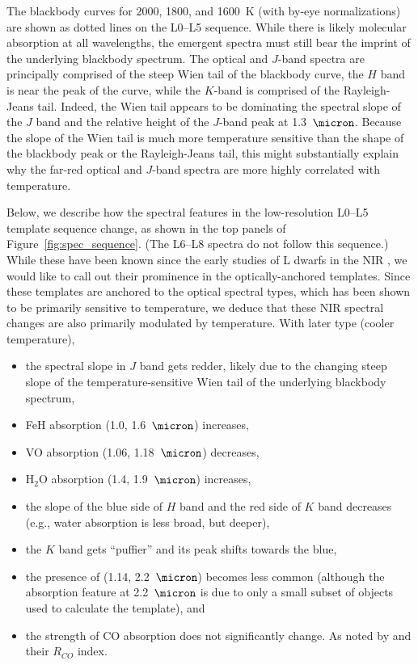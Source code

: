 \documentclass[12pt,preprint]{aastex}
\begin{document}
The blackbody curves for 2000, 1800, and 1600~K (with by-eye normalizations) are shown as dotted lines on the L0--L5 sequence. 
While there is likely molecular absorption at all wavelengths, the emergent spectra must still bear the imprint of the underlying blackbody spectrum.
The optical and $J$-band spectra are principally comprised of the steep Wien tail of the blackbody curve,
the $H$ band is near the peak of the curve, while the $K$-band is comprised of the Rayleigh-Jeans tail.
Indeed, the Wien tail appears to be dominating the spectral slope of the $J$ band and the relative height of the $J$-band peak at 1.3~$\micron$.
Because the slope of the Wien tail is much more temperature sensitive than the shape of the blackbody peak or the Rayleigh-Jeans tail, this might substantially explain why the far-red optical and $J$-band spectra are more highly correlated with temperature.

Below, we describe how the spectral features in the low-resolution L0--L5 template sequence change, as shown in the top panels of Figure~\ref{fig:spec_sequence}. (The L6--L8 spectra do not follow this sequence.)
While these have been known since the early studies of L dwarfs in the NIR \citep{Testi01,Geballe02}, we would like to call out their prominence in the optically-anchored templates.
Since these templates are anchored to the optical spectral types, which has been shown to be primarily sensitive to temperature, we deduce that these NIR spectral changes are also primarily modulated by temperature.
With later type (cooler temperature), 
\begin{itemize}
\item the spectral slope in $J$ band gets redder, likely due to the changing steep slope of the temperature-sensitive Wien tail of the underlying blackbody spectrum,
\item FeH absorption (1.0, 1.6~$\micron$) increases,
\item VO absorption (1.06, 1.18~$\micron$) decreases,
\item H$_2$O absorption (1.4, 1.9~$\micron$) increases,
\item the slope of the blue side of $H$ band and the red side of $K$ band decreases (e.g., water absorption is less broad, but deeper), 
\item the $K$ band gets ``puffier'' and its peak shifts towards the blue,
\item the presence of  (1.14, 2.2~$\micron$) becomes less common (although the absorption feature at 2.2~$\micron$ is due to only a small subset of objects used to calculate the template), and
\item the strength of CO absorption does not significantly change. As noted by \citet{Reid01_NIR} and their $R_{CO}$ index.
\end{itemize}
\end{document}
